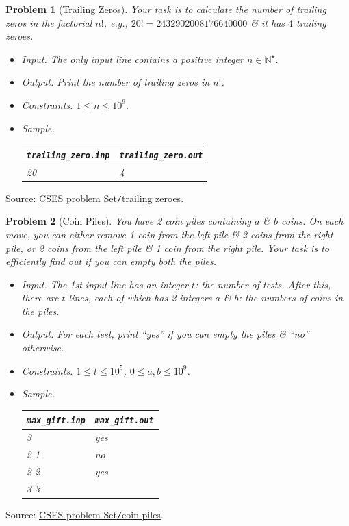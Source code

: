 \documentclass{article}
\newtheorem{problem}{Problem}
\begin{document}
\begin{problem}[Trailing Zeros]
	Your task is to calculate the number of trailing zeros in the factorial $n!$, e.g., $20! = 2432902008176640000$ \& it has $4$ trailing zeroes.
	\begin{itemize}
		\item {\sf Input.} The only input line contains a positive integer $n\in\mathbb{N}^\star$.
		\item {\sf Output.} Print the number of trailing zeros in $n!$.
		\item {\sf Constraints.} $1\le n\le10^9$.
		\item {\sf Sample.}
		\begin{table}[H]
			\centering
			\begin{tabular}{|l|l|}
				\hline
				\verb|trailing_zero.inp| & \verb|trailing_zero.out| \\
				\hline
				20 & 4 \\
				\hline
			\end{tabular}
		\end{table}
	\end{itemize}
\end{problem}
Source: \href{https://cses.fi/problemset/task/1618}{CSES problem Set{\tt/}trailing zeroes}.

\begin{problem}[Coin Piles]
	You have 2 coin piles containing $a$ 
	\& $b$ coins. On each move, you can either remove 1 coin from the left pile \& 2 coins from the right pile, or 2 coins from the left pile \& 1 coin from the right pile. Your task is to efficiently find out if you can empty both the piles.
	\begin{itemize}
		\item {\sf Input.} The 1st input line has an integer $t$: the number of tests. After this, there are $t$ lines, each of which has 2 integers $a$ \& $b$: the numbers of coins in the piles.
		\item {\sf Output.} For each test, print ``yes'' if you can empty the piles \& ``no'' otherwise.
		\item {\sf Constraints.} $1\le t\le10^5$, $0\le a,b\le10^9$.
		\item {\sf Sample.}
		\begin{table}[H]
			\centering
			\begin{tabular}{|l|l|}
				\hline
				\verb|max_gift.inp| & \verb|max_gift.out| \\
				\hline
				3 & yes \\
				2 1 & no \\
				2 2 & yes \\
				3 3 & \\
				\hline
			\end{tabular}
		\end{table}
	\end{itemize}
\end{problem}
Source: \href{https://cses.fi/problemset/task/1754}{CSES problem Set{\tt/}coin piles}.
\end{document}
